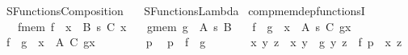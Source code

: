 %
\begin{isabellebody}%
%
%
\isadelimdocument
%
\endisadelimdocument
%
\isatagdocument
%
\isamarkuptrue%
%
\endisatagdocument
{\isafolddocument}%
%
\isadelimdocument
%
\endisadelimdocument
%
\isadelimtheory
%
\endisadelimtheory
%
\isatagtheory
{}\isamarkupfalse%
\ SFunctions{\isacharunderscore}{\kern0pt}Composition\isanewline
\ \ \ SFunctions{\isacharunderscore}{\kern0pt}Lambda\isanewline
{}%
\endisatagtheory
{\isafoldtheory}%
%
\isadelimtheory
\isanewline
%
\endisadelimtheory
\isanewline
{}\isamarkupfalse%
\ comp{\isacharunderscore}{\kern0pt}mem{\isacharunderscore}{\kern0pt}dep{\isacharunderscore}{\kern0pt}functionsI{\isacharcolon}{\kern0pt}\isanewline
\ \ \ f{\isacharunderscore}{\kern0pt}mem{\isacharcolon}{\kern0pt}\ {\isachardoublequoteopen}f\ {\isasymin}\ {\isacharparenleft}{\kern0pt}x\ {\isasymin}\ B{\isacharparenright}{\kern0pt}\ {\isasymrightarrow}s\ {\isacharparenleft}{\kern0pt}C\ x{\isacharparenright}{\kern0pt}{\isachardoublequoteclose}\isanewline
\ \ \ g{\isacharunderscore}{\kern0pt}mem{\isacharcolon}{\kern0pt}\ {\isachardoublequoteopen}g\ {\isasymin}\ A\ {\isasymrightarrow}s\ B{\isachardoublequoteclose}\isanewline
\ \ \ {\isachardoublequoteopen}f\ {\isasymcirc}\ g\ {\isasymin}\ {\isacharparenleft}{\kern0pt}x\ {\isasymin}\ A{\isacharparenright}{\kern0pt}\ {\isasymrightarrow}s\ {\isacharparenleft}{\kern0pt}C\ {\isacharparenleft}{\kern0pt}g{\isacharbackquote}{\kern0pt}x{\isacharparenright}{\kern0pt}{\isacharparenright}{\kern0pt}{\isachardoublequoteclose}\isanewline
%
\isadelimproof
%
\endisadelimproof
%
\isatagproof
{}\isamarkupfalse%
\isanewline
\ \ \isamarkupfalse%
\ {\isachardoublequoteopen}f\ {\isasymcirc}\ g\ {\isasymsubseteq}\ {\isasymSum}x\ {\isasymin}\ A{\isachardot}{\kern0pt}\ {\isacharparenleft}{\kern0pt}C\ {\isacharparenleft}{\kern0pt}g{\isacharbackquote}{\kern0pt}x{\isacharparenright}{\kern0pt}{\isacharparenright}{\kern0pt}{\isachardoublequoteclose}\isanewline
\ \ \isamarkupfalse%
\isanewline
\ \ \ \ \isamarkupfalse%
\ p\ \isamarkupfalse%
\ {\isachardoublequoteopen}p\ {\isasymin}\ f\ {\isasymcirc}\ g{\isachardoublequoteclose}\isanewline
\ \ \ \ \isamarkupfalse%
\ \isamarkupfalse%
\ x\ y\ z\ \ {\isachardoublequoteopen}{\isasymlangle}x{\isacharcomma}{\kern0pt}\ y{\isasymrangle}\ {\isasymin}\ g{\isachardoublequoteclose}\ {\isachardoublequoteopen}{\isasymlangle}y{\isacharcomma}{\kern0pt}\ z{\isasymrangle}\ {\isasymin}\ f{\isachardoublequoteclose}\ {\isachardoublequoteopen}p\ {\isacharequal}{\kern0pt}\ {\isasymlangle}x{\isacharcomma}{\kern0pt}\ z{\isasymrangle}{\isachardoublequoteclose}\ \isamarkupfalse%

\end{isabellebody}
